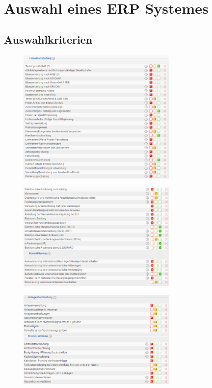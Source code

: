 \documentclass[12pt]{article}
\begin{document}
\section{Auswahl eines ERP Systemes}
\subsection{Auswahlkriterien}
\begin{figure}[here!]
\centering
\includegraphics[width=0.7\textwidth]{images/tr1}
\end{figure}\FloatBarrier
\noindent
\begin{figure}[here!]
\centering
\includegraphics[width=0.7\textwidth]{images/tr2}
\end{figure}\FloatBarrier
\noindent
\begin{figure}[here!]
\centering
\includegraphics[width=0.7\textwidth]{images/tr3}
\end{figure}\FloatBarrier
\end{document}
